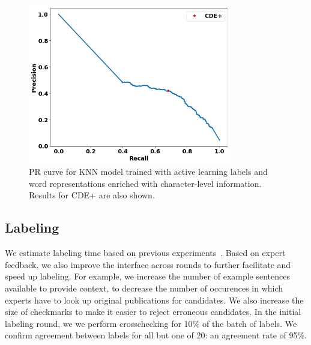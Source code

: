 \begin{figure}
\centering
\includegraphics[trim=0in 0.1in 0.1in 0.in,clip,width=3.5in]{figures/fasttext_prc_al_corpus_round5_100}
\caption{PR curve for KNN model trained with active learning labels and word representations enriched with character-level information. Results for CDE+ are also shown.
}
\label{fig:UBS_prcs_fasttext}
\end{figure}

\subsection{Labeling}\label{sec:labeling}
We estimate labeling time based on previous experiments~\cite{tchoua2019polyner}.
Based on expert feedback, we also improve the interface across rounds to further facilitate and speed up labeling.
For example, we increase the number of example sentences available to provide context, to decrease the number of occurences in which experts have to look up original publications for candidates.
We also increase the size of checkmarks to make it easier to reject erroneous candidates.
In the initial labeling round, we
we perform crosschecking for 10\% of the batch of labels. 
We confirm agreement between labels for all but one of 20: an agreement rate of 95\%.











